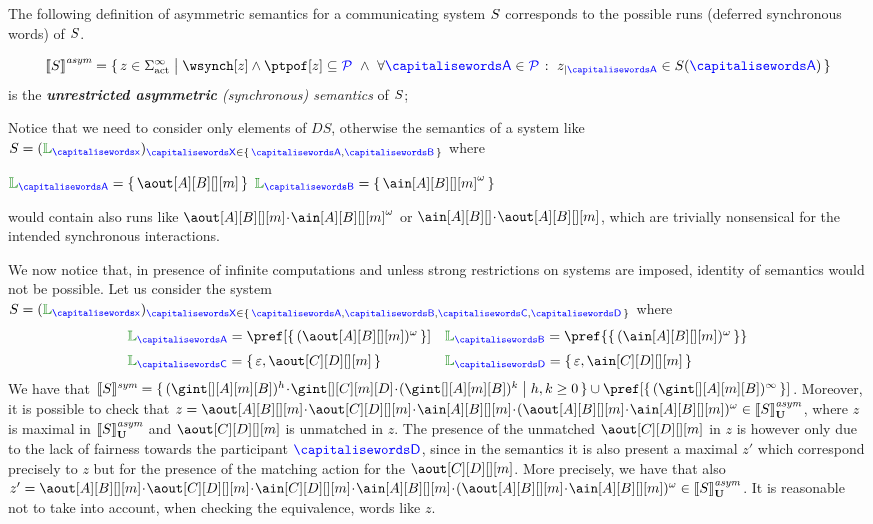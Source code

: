 The following definition of asymmetric semantics for a communicating system $S$ corresponds
to the possible runs (deferred synchronous words) of  $S$.



\begin{definition}
 \[
	 \asem{\aCS} = \Set{z \in \alfact^\infty \sst \wsynch[z] \land\ptpof[z] \subseteq \ptpset \ \land\ \forall \p \in
		\ptpset \qst \filter{z}{\p} \in \aCS(\p)  }
  \]
  is the \emph{{\bf unrestricted asymmetric} (synchronous) semantics} of $S$;
\end{definition}

Notice that we need to consider only elements of $DS$, otherwise the semantics of a system like
$\aCS = ({\alang}_{\px})_{\ptp[X] \in \Set{\p,\q}}$ where\\
\centerline{$\alang_{\p}= \Set{\aout[A][B][][m]}$ \qquad $\alang_{\q}= \Set{\ain[A][B][][m]^\omega}$ }
would contain also runs like 
$\aout[A][B][][m]\cat\ain[A][B][][m]^\omega$ or $\ain[A][B][]\cat\aout[A][B][][m]$, which are trivially nonsensical for the intended synchronous interactions.


We now notice that, in presence of infinite computations and unless strong restrictions on systems are imposed, 
identity of semantics would not be possible.
Let us consider the system
$\aCS = ({\alang}_{\px})_{\ptp[X] \in \Set{\p,\q, \ptp[C], \ptp[D]}}$ where
$$\begin{array}{ll}
\alang_{\p}= \pref[\Set{(\aout[A][B][][m])^\omega}] &
\alang_{\q}= \pref{\Set{(\ain[A][B][][m])^\omega}}  \\[2mm]
\alang_{\ptp[C]}= \Set{\emptyword, \aout[C][D][][m]} &
\alang_{\ptp[D]}= \Set{\emptyword,\ain[C][D][][m]}
\end{array}$$
We have that 
$\ssem{\aCS} = 
\Set{(\gint[][A][m][B])^h\cat\gint[][C][m][D]\cat(\gint[][A][m][B])^k \sst h,k\geq 0}\cup\pref[\Set{(\gint[][A][m][B])^\infty}]$.
Moreover, it is possible to check that 
$z = \aout[A][B][][m]\cat\aout[C][D][][m]\cat\ain[A][B][][m]\cat(\aout[A][B][][m]\cat\ain[A][B][][m])^\omega\in\gasem{\aCS}$, where $z$ is maximal in ${\llbracket S \rrbracket}^{\textit{asym}}_{\mathbf{U}}$ and  $\aout[C][D][][m]$ is unmatched in $z$.
The presence of the unmatched $\aout[C][D][][m]$ in $z$ is however only due to the lack
of fairness towards the participant $\ptp[D]$, since in the semantics it is also present
a maximal $z'$ which correspond precisely to $z$ but for the presence of the matching
action for the $\aout[C][D][][m]$. More precisely, we have
that also  $z' = \aout[A][B][][m]\cat\aout[C][D][][m]\cat\ain[C][D][][m]\cat\ain[A][B][][m]\cat(\aout[A][B][][m]\cat\ain[A][B][][m])^\omega\in\gasem{\aCS}$.
It is reasonable not to take into account, when checking the equivalence, words like $z$.

